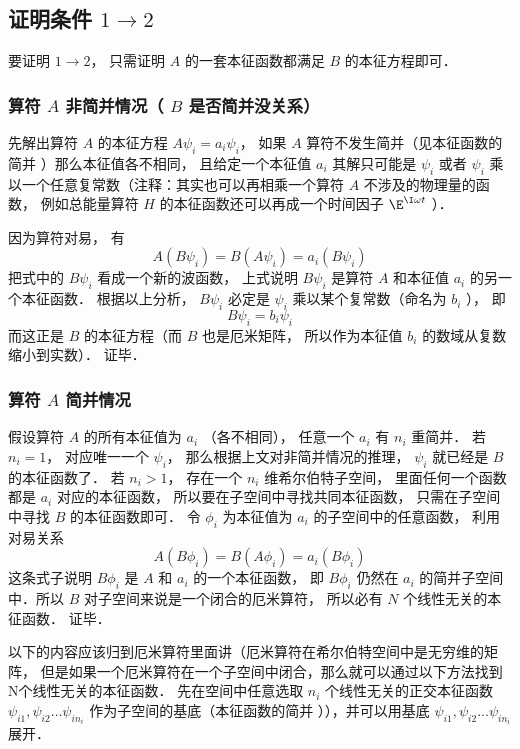 \subsection{证明条件 $1 \to 2$}
要证明 $1 \to 2$，  只需证明 $A$ 的一套本征函数都满足 $B$ 的本征方程即可．

\subsubsection{算符 $A$ 非简并情况（ $B$ 是否简并没关系）}
先解出算符 $A$ 的本征方程 $A \psi_i = a_i \psi_i$，  如果 $A$ 算符不发生简并（见本征函数的简并%
  ）那么本征值各不相同， 且给定一个本征值 $a_i$ 其解只可能是 $\psi_i$ 或者 $\psi_i$ 乘以一个任意复常数（注释：其实也可以再相乘一个算符 $A$ 不涉及的物理量的函数， 例如总能量算符 $H$ 的本征函数还可以再成一个时间因子 $\E^{\I\omega t}$ ）．

因为算符对易， 有
\begin{equation}
A (B \psi_i) = B (A \psi_i) = a_i (B \psi_i)
\end{equation}
把式中的 $B \psi_i$ 看成一个新的波函数， 上式说明 $B \psi_i$ 是算符 $A$ 和本征值 $a_i$ 的另一个本征函数． 根据以上分析， $B \psi_i$ 必定是 $\psi_i$ 乘以某个复常数（命名为 $b_i$ ）， 即
\begin{equation}
B \psi_i = b_i \psi_i
\end{equation}
而这正是 $B$ 的本征方程（而 $B$ 也是厄米矩阵， 所以作为本征值 $b_i$ 的数域从复数缩小到实数）． 证毕．

\subsubsection{算符 $A$ 简并情况}
假设算符 $A$ 的所有本征值为 $a_i$ （各不相同）， 任意一个 $a_i$ 有 $n_i$ 重简并． 若 $n_i = 1$，  对应唯一一个 $\psi_i$，  那么根据上文对非简并情况的推理， $\psi_i$ 就已经是 $B$ 的本征函数了． 若 $n_i > 1$，  存在一个 $n_i$ 维希尔伯特子空间， 里面任何一个函数都是 $a_i$ 对应的本征函数， 所以要在子空间中寻找共同本征函数， 只需在子空间中寻找 $B$ 的本征函数即可． 令 $\phi_i$ 为本征值为 $a_i$ 的子空间中的任意函数， 利用对易关系
\begin{equation}
A (B \phi_i) = B (A \phi_i) = a_i (B \phi_i)
\end{equation}
这条式子说明 $B \phi_i$ 是 $A$ 和 $a_i$ 的一个本征函数， 即 $B \phi_i$ 仍然在 $a_i$ 的简并子空间中．所以 $B$ 对子空间来说是一个闭合的厄米算符， 所以必有 $N$ 个线性无关的本征函数． 证毕．%

以下的内容应该归到厄米算符里面讲（厄米算符在希尔伯特空间中是无穷维的矩阵， 但是如果一个厄米算符在一个子空间中闭合，那么就可以通过以下方法找到N个线性无关的本征函数．%
先在空间中任意选取 $n_i$ 个线性无关的正交本征函数 $\psi_{i1}, \psi_{i2}\dots \psi_{i n_i}$ 作为子空间的基底（本征函数的简并%
）），并可以用基底 $\psi_{i1}, \psi_{i2}\dots \psi_{i n_i}$ 展开．

